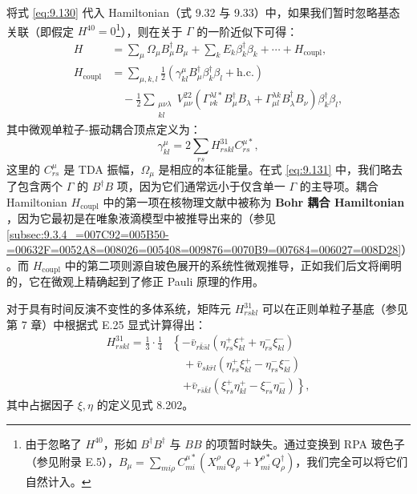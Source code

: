 将式 \ref{eq:9.130} 代入 Hamiltonian（式 9.32 与 9.33）中，如果我们暂时忽略基态关联（即假定
$H^{40}=0$\footnote{由于忽略了 $H^{40}$，形如 $B^{\dagger}B^{\dagger}$ 与 $BB$ 的项暂时缺失。通过变换到
RPA 玻色子（参见附录 E.5），$B_{\mu}=\sum_{mi\rho}C^{\mu*}_{mi}(X^{\rho}_{mi}Q_{\rho}+Y^{\rho*}_{mi}Q^{\dagger}_{\rho})$，我们完全可以将它们自然计入。}），则在关于 $\Gamma$ 的一阶近似下可得：
\begin{align}
H & =\sum_{\mu}\Omega_{\mu}B^{\dagger}_{\mu}B_{\mu}+\sum_{k}E_{k}\beta^{\dagger}_{k}\beta_{k}+\cdots+H_{\text{coupl}},\nonumber \\
H_{\text{coupl}} & =\sum_{\mu,k,l}\frac{1}{2}\left(\gamma^{\mu}_{kl}B^{\dagger}_{\mu}\beta^{\dagger}_{k}\beta_{l}+\text{h.c.}\right)\label{eq:9.131}\\
 & \quad-\frac{1}{2}\sum_{\substack{\mu\nu\lambda\\
kl
}
}V^{22}_{\mu\nu}\left(\Gamma^{\lambda l*}_{\nu k}B^{\dagger}_{\mu}B_{\lambda}+\Gamma^{\lambda k}_{\mu l}B^{\dagger}_{\lambda}B_{\nu}\right)\beta^{\dagger}_{k}\beta_{l},\nonumber 
\end{align}
其中微观单粒子-振动耦合顶点定义为：
\begin{equation}
\gamma^{\mu}_{kl}=2\sum_{rs}H^{31}_{rskl}C^{\mu*}_{rs},\label{eq:9.132}
\end{equation}
这里的 $C^{\mu}_{rs}$ 是 TDA 振幅，$\Omega_{\mu}$ 是相应的本征能量。在式 \ref{eq:9.131}
中，我们略去了包含两个 $\Gamma$ 的 $B^{\dagger}B$ 项，因为它们通常远小于仅含单一 $\Gamma$
的主导项。耦合 Hamiltonian $H_{\text{coupl}}$ 中的第一项在核物理文献中被称为 \textbf{Bohr
耦合 Hamiltonian} \cite{BM75}，因为它最初是在唯象液滴模型中被推导出来的（参见 \ref{subsec:9.3.4_=007C92=005B50-=00632F=0052A8=008026=005408=009876=0070B9=007684=006027=008D28}）。而
$H_{\text{coupl}}$ 中的第二项则源自玻色展开的系统性微观推导，正如我们后文将阐明的，它在微观上精确起到了修正 Pauli
原理的作用。

对于具有时间反演不变性的多体系统，矩阵元 $H^{31}_{rskl}$ 可以在正则单粒子基底（参见第 7 章）中根据式 E.25
显式计算得出：
\begin{align}
H^{31}_{rskl}=\frac{1}{3}\cdot\frac{1}{4} & \left\{ -\bar{v}_{r\bar{k}\bar{s}l}\left(\eta^{+}_{rs}\xi^{+}_{kl}+\eta^{-}_{rs}\xi^{-}_{kl}\right)\right.\nonumber \\
 & \quad+\bar{v}_{sk\bar{r}l}\left(\eta^{+}_{rs}\xi^{+}_{kl}-\eta^{-}_{rs}\xi^{-}_{kl}\right)\label{eq:9.133}\\
 & \quad\left.+\bar{v}_{r\bar{s}\bar{k}l}\left(\xi^{+}_{rs}\eta^{+}_{kl}-\xi^{-}_{rs}\eta^{-}_{kl}\right)\right\} ,\nonumber 
\end{align}
其中占据因子 $\xi,\eta$ 的定义见式 8.202。

